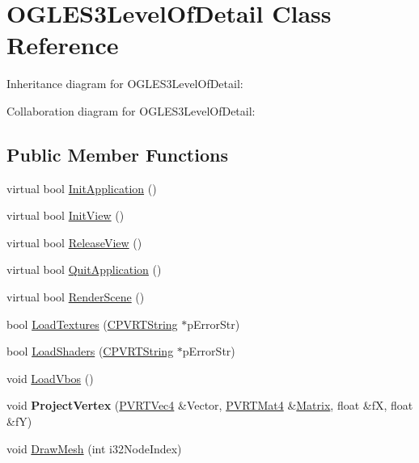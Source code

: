 \hypertarget{class_o_g_l_e_s3_level_of_detail}{\section{O\+G\+L\+E\+S3\+Level\+Of\+Detail Class Reference}
\label{class_o_g_l_e_s3_level_of_detail}
}


Inheritance diagram for O\+G\+L\+E\+S3\+Level\+Of\+Detail\+:


Collaboration diagram for O\+G\+L\+E\+S3\+Level\+Of\+Detail\+:
\subsection*{Public Member Functions}
\begin{DoxyCompactItemize}
\item 
virtual bool \hyperlink{class_o_g_l_e_s3_level_of_detail_ae17ee05aaf53572df9ed9e616b128282}{Init\+Application} ()
\item 
virtual bool \hyperlink{class_o_g_l_e_s3_level_of_detail_adee09d612be8741320011562c095c0a1}{Init\+View} ()
\item 
virtual bool \hyperlink{class_o_g_l_e_s3_level_of_detail_a66148e97185ddb2cb1eb840fe0dc6f37}{Release\+View} ()
\item 
virtual bool \hyperlink{class_o_g_l_e_s3_level_of_detail_ac331101c450f6fda5abf688d45c0dc91}{Quit\+Application} ()
\item 
virtual bool \hyperlink{class_o_g_l_e_s3_level_of_detail_a9adfd77b3c7cbc62f6ec39101eeef23a}{Render\+Scene} ()
\item 
bool \hyperlink{class_o_g_l_e_s3_level_of_detail_a5eb6619ea84b9b35ed1b6d98dab8f8c4}{Load\+Textures} (\hyperlink{class_c_p_v_r_t_string}{C\+P\+V\+R\+T\+String} $\ast$p\+Error\+Str)
\item 
bool \hyperlink{class_o_g_l_e_s3_level_of_detail_ae0d7231fdb4b8a20e17704876e23c67d}{Load\+Shaders} (\hyperlink{class_c_p_v_r_t_string}{C\+P\+V\+R\+T\+String} $\ast$p\+Error\+Str)
\item 
void \hyperlink{class_o_g_l_e_s3_level_of_detail_a2467d32fbc001ccad00c8296762439b0}{Load\+Vbos} ()
\item 
\hypertarget{class_o_g_l_e_s3_level_of_detail_a2dddc15d053ac6035dd07e3417b4e138}{void {\bfseries Project\+Vertex} (\hyperlink{struct_p_v_r_t_vec4}{P\+V\+R\+T\+Vec4} \&Vector, \hyperlink{struct_p_v_r_t_mat4}{P\+V\+R\+T\+Mat4} \&\hyperlink{class_matrix}{Matrix}, float \&f\+X, float \&f\+Y)}\label{class_o_g_l_e_s3_level_of_detail_a2dddc15d053ac6035dd07e3417b4e138}

\item 
void \hyperlink{class_o_g_l_e_s3_level_of_detail_aef48c77d448b6b84b216bc812ed7d876}{Draw\+Mesh} (int i32\+Node\+Index)
\end{DoxyCompactItemize}


